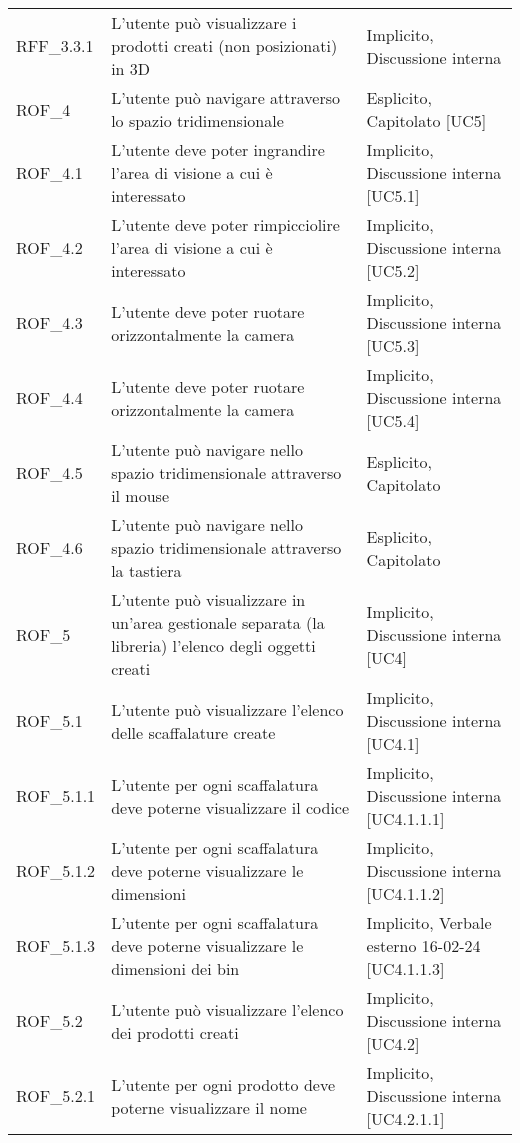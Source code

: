 \begin{xltabular}{\textwidth}{ p{0.1\textwidth} | X | p{0.3\textwidth} }
    RFF\_3.3.1 & L'utente può visualizzare i prodotti creati (non posizionati) in 3D & Implicito, Discussione interna \\      
    ROF\_4 & L'utente può navigare attraverso lo spazio tridimensionale & Esplicito, Capitolato [UC5]\\
    ROF\_4.1 & L'utente deve poter ingrandire l'area di visione a cui è interessato & Implicito, Discussione interna [UC5.1] \\
    ROF\_4.2 & L'utente deve poter rimpicciolire l'area di visione a cui è interessato & Implicito, Discussione interna [UC5.2] \\
    ROF\_4.3 & L'utente deve poter ruotare orizzontalmente la camera & Implicito, Discussione interna [UC5.3] \\
    ROF\_4.4 & L'utente deve poter ruotare orizzontalmente la camera & Implicito, Discussione interna [UC5.4] \\
    ROF\_4.5 & L'utente può navigare nello spazio tridimensionale attraverso il mouse& Esplicito, Capitolato\\
    ROF\_4.6 & L'utente può navigare nello spazio tridimensionale attraverso la tastiera& Esplicito, Capitolato\\
    ROF\_5 & L'utente può visualizzare in un'area gestionale separata (la libreria) l'elenco degli oggetti creati & Implicito, Discussione interna [UC4] \\
    ROF\_5.1 & L'utente può visualizzare l'elenco delle scaffalature create & Implicito, Discussione interna [UC4.1] \\
    ROF\_5.1.1 & L'utente per ogni scaffalatura deve poterne visualizzare il codice & Implicito, Discussione interna [UC4.1.1.1]\\
    ROF\_5.1.2 & L'utente per ogni scaffalatura deve poterne visualizzare le dimensioni & Implicito, Discussione interna [UC4.1.1.2]\\
    ROF\_5.1.3 & L'utente per ogni scaffalatura deve poterne visualizzare le dimensioni dei bin & Implicito, Verbale esterno 16-02-24 [UC4.1.1.3]\\
    ROF\_5.2 & L'utente può visualizzare l'elenco dei prodotti creati & Implicito, Discussione interna [UC4.2] \\
    ROF\_5.2.1 & L'utente per ogni prodotto deve poterne visualizzare il nome & Implicito, Discussione interna [UC4.2.1.1]\\

\end{xltabular}
